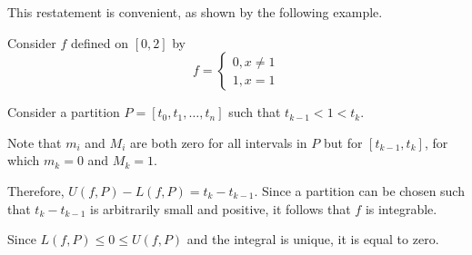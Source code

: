 \documentclass[11pt]{scrartcl}
\begin{document}
This restatement is convenient, as shown by the following example.
\begin{example}

  Consider \(f\) defined on \([0, 2]\) by
  \begin{equation*}
    f = \begin{cases}
      0, x \neq 1\\
      1, x = 1
    \end{cases}
  \end{equation*}

  Consider a partition \(P= [t_{0}, t_{1}, \dots, t_{n}]\) such that
  \(t_{k-1} < 1 < t_{k}\).

  Note that \(m_{i}\) and \(M_{i}\) are both zero for all intervals in
  \(P\) but for \([t_{k-1}, t_{k}]\), for which \(m_{k} = 0\) and
  \(M_{k} = 1\).

  Therefore, \(U(f, P) - L(f, P) = t_{k} - t_{k-1}\). Since a partition
  can be chosen such that \(t_{k} - t_{k-1}\) is arbitrarily small and
  positive, it follows that \(f\) is integrable.

  Since \(L(f, P) \leq 0 \leq U(f, P)\) and the integral is unique, it
  is equal to zero.


\end{example}
\end{document}
